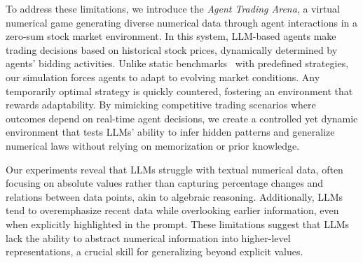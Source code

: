 To address these limitations, we introduce the \textit{Agent Trading Arena}, a virtual numerical game generating diverse numerical data through agent interactions in a zero-sum stock market environment. In this system, LLM-based agents make trading decisions based on historical stock prices, dynamically determined by agents' bidding activities. Unlike static benchmarks~\citep{mathbenchmark} with predefined strategies, our simulation forces agents to adapt to evolving market conditions. Any temporarily optimal strategy is quickly countered, fostering an environment that rewards adaptability. By mimicking competitive trading scenarios where outcomes depend on real-time agent decisions, we create a controlled yet dynamic environment that tests LLMs' ability to infer hidden patterns and generalize numerical laws without relying on memorization or prior knowledge.


Our experiments reveal that LLMs struggle with textual numerical data, often focusing on absolute values rather than capturing percentage changes and relations between data points, akin to algebraic reasoning. Additionally, LLMs tend to overemphasize recent data while overlooking earlier information, even when explicitly highlighted in the prompt. These limitations suggest that LLMs lack the ability to abstract numerical information into higher-level representations, a crucial skill for generalizing beyond explicit values.


